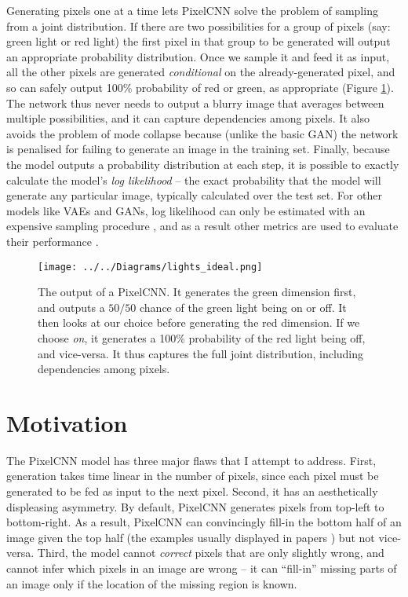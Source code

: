 \documentclass[10pt,a4paper]{article}
\newcommand{\nquote}[1]{``{#1}''}
\begin{document}
Generating pixels one at a time lets PixelCNN solve the problem of sampling from a joint distribution. If there are two possibilities for a group of pixels (say: green light or red light) the first pixel in that group to be generated will output an appropriate probability distribution. Once we sample it and feed it as input, all the other pixels are generated \emph{conditional} on the already-generated pixel, and so can safely output 100\% probability of red or green, as appropriate (Figure \ref{lightsideal}). The network thus never needs to output a blurry image that averages between multiple possibilities, and it can capture dependencies among pixels. It also avoids the problem of mode collapse because (unlike the basic GAN) the network is penalised for failing to generate an image in the training set. Finally, because the model outputs a probability distribution at each step, it is possible to exactly calculate the model's \emph{log likelihood} -- the exact probability that the model will generate any particular image, typically calculated over the test set. For other models like VAEs and GANs, log likelihood can only be estimated with an expensive sampling procedure \citep{likelihoodestimation}, and as a result other metrics are used to evaluate their performance \citep{ganmetrics}.

\begin{figure}
  \centering
  \texttt{[image: ../../Diagrams/lights\_ideal.png]}
  \caption{The output of a PixelCNN. It generates the green dimension first, and outputs a $50/50$ chance of the green light being on or off. It then looks at our choice before generating the red dimension. If we choose \emph{on}, it generates a 100\% probability of the red light being off, and vice-versa. It thus captures the full joint distribution, including dependencies among pixels.}
  \label{lightsideal}
\end{figure}

\section{Motivation}

The PixelCNN model has three major flaws that I attempt to address. First, generation takes time linear in the number of pixels, since each pixel must be generated to be fed as input to the next pixel. Second, it has an aesthetically displeasing asymmetry. By default, PixelCNN generates pixels from top-left to bottom-right. As a result, PixelCNN can convincingly fill-in the bottom half of an image given the top half (the examples usually displayed in papers \citep{pixelcnn1,??,??}) but not vice-versa. Third, the model cannot \emph{correct} pixels that are only slightly wrong, and cannot infer which pixels in an image are wrong -- it can \nquote{fill-in} missing parts of an image only if the location of the missing region is known.
\end{document}
